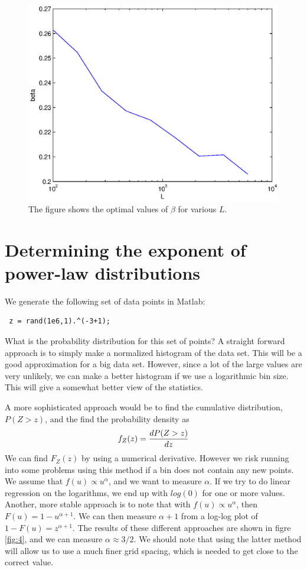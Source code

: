 \documentclass[12pt]{article}
\begin{document}
\begin{figure}[ht]
\centering

	\includegraphics[width=13cm]{differentbetas.eps}


\caption[Optional caption for list of figures]{The figure shows the optimal values of $\beta$ for various $L$.}
\label{fig:beta}
\end{figure}
 

\section{Determining the exponent of power-law distributions}
We generate the following set of data points in Matlab: 
\begin{verbatim}
 z = rand(1e6,1).^(-3+1);
\end{verbatim}
What is the probability distribution for this set of points? A straight forward approach is to simply make a normalized histogram of the data set. This will be a good approximation for a big data set. However, since a lot of the large values are very unlikely, we can make a better histogram if we use a logarithmic bin size. This will give a somewhat better view of the statistics. 

A more sophisticated approach would be to find the cumulative distribution, $P(Z>z)$, and the find the probability density as 
\begin{equation}
 f_Z(z) = {dP(Z>z) \over dz}
\end{equation}
We can find $F_Z(z)$ by using a numerical derivative. However we risk running into some problems using this method if a bin does not contain any new points. We assume that $f(u) \propto u^\alpha$, and we want to measure $\alpha$. If we try to do linear regression on the logarithms, we end up with $log(0)$ for one or more values. Another, more stable approach is to note that with $f(u) \propto u^\alpha$, then $F(u) = 1-u^{\alpha+1}$. We can then measure $\alpha+1$ from a log-log plot of $1-F(u) = z^{\alpha+1}$. The results of these different approaches are shown in figre \ref{fig:4}, and we can measure $\alpha \approx 3/2$. We should note that using the latter method will allow us to use a much finer grid spacing, which is needed to get close to the correct value.
\end{document}
